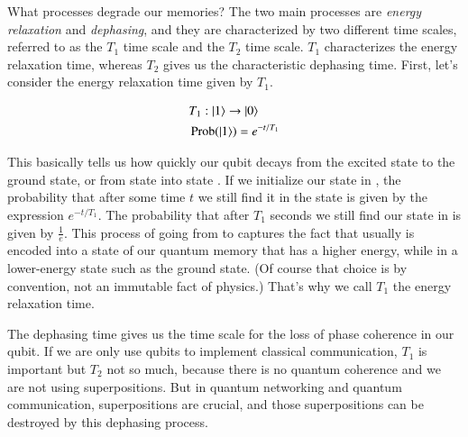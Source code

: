 What processes degrade our memories? The two main processes are \emph{energy relaxation} and \emph{dephasing}, and they are characterized by two different time scales, referred to as the $T_1$ time scale and the $T_2$ time scale.  $T_1$ characterizes the energy relaxation time, whereas $T_2$ gives us the characteristic dephasing time. First, let's consider the energy relaxation time given by $T_1$.

\begin{equation}
\begin{aligned}
&T_1:|1\rangle \rightarrow|0\rangle \\
&\operatorname{Prob}(\left| 1 \right\rangle)=e^{-t / T_1}
\end{aligned}
\end{equation}

This basically tells us how quickly our qubit decays from the excited state to the ground state, or from state  into state . If we initialize our state in , the probability that after some time $t$ we still find it in the state  is given by the expression $e^{-t/T_1}$. The probability that after $T_1$ seconds we still find our state in  is given by $\frac{1}{e}$. This process of going from  to  captures the fact that usually  is encoded into a state of our quantum memory that has a higher energy, while  in a lower-energy state such as the ground state. (Of course that choice is by convention, not an immutable fact of physics.)  That's why we call $T_1$ the energy relaxation time.

The dephasing time gives us the time scale for the loss of phase coherence in our qubit. If we are only use qubits to implement classical communication,  $T_1$ is important but  $T_2$ not so much, because there is no quantum coherence and we are not using superpositions. But in quantum networking and quantum communication, superpositions are crucial, and those superpositions can be destroyed by this dephasing process.


